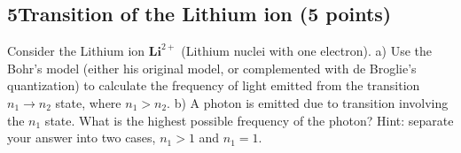 \documentclass[12pt]{book} %
\numberwithin{equation}{chapter}
\def\lq{\hspace{2.5ex}}
\begin{document}
\subsection*{5\lq Transition of the Lithium ion (5 points)}
Consider the Lithium ion $\mathbf{Li}^{2+}$ (Lithium nuclei with one electron).\bigskip\newline
a) Use the Bohr's model (either his original model, or complemented with de Broglie's quantization) to calculate the frequency of light emitted from the transition $n_{1}\to n_{2}$ state, where $n_{1}>n_{2}$.\bigskip\newline
b) A photon is emitted due to transition involving the $n_{1}$ state. What is the highest possible frequency of the photon?\bigskip\newline
Hint: separate your answer into two cases, $n_{1}>1$ and $n_{1}=1$.
\end{document}
